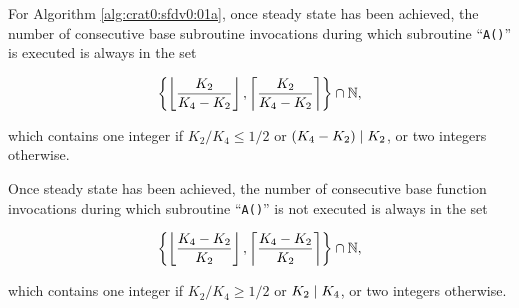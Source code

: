 \begin{vworklemmastatement}
\label{lem:crat0:sfdv0:sprc0:03}
For Algorithm \ref{alg:crat0:sfdv0:01a}, once steady
state has been achieved, the number of consecutive
base subroutine invocations during which subroutine
``\texttt{A()}'' is executed is always in the set

\begin{equation}
\label{eq:lem:crat0:sfdv0:sprc0:03:01}
\left\{
\left\lfloor \frac{K_2}{K_4 - K_2} \right\rfloor ,
\left\lceil  \frac{K_2}{K_4 - K_2} \right\rceil
\right\} \cap {\mathbb{N}},
\end{equation}

which contains one integer if $K_2/K_4 \leq 1/2$ or $(K_4-K_2) \mid K_2$, 
or two integers otherwise.

Once steady state has been achieved, the number of
consecutive base function invocations during which
subroutine ``\texttt{A()}'' is not executed is
always in the set

\begin{equation}
\label{eq:lem:crat0:sfdv0:sprc0:03:02}
\left\{
\left\lfloor \frac{K_4-K_2}{K_2} \right\rfloor ,
\left\lceil  \frac{K_4-K_2}{K_2} \right\rceil
\right\} \cap {\mathbb{N}},
\end{equation}

which contains one integer if $K_2/K_4 \geq 1/2$ or $K_2 \mid K_4$,
or two integers otherwise.
\end{vworklemmastatement}
